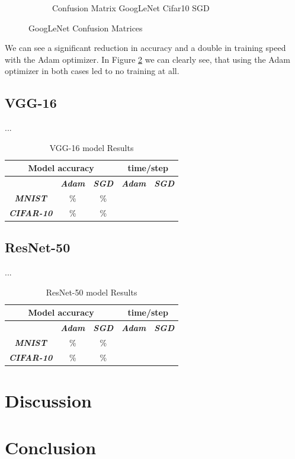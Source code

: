 \documentclass[conference]{IEEEtran}
\begin{document}
\begin{figure}[!htbp]
\begin{subfigure}[b]{0.22\textwidth}
        \caption{Confusion Matrix GoogLeNet Cifar10 SGD}
        \label{fig:x matrix_GoogLeNet_CIFAR_SGD}
    \end{subfigure}
    \caption{GoogLeNet Confusion Matrices}
    \label{fig:GoogLeNet Confusion Matrixis}
\end{figure}

We can see a significant reduction in accuracy and a double in training speed with the Adam optimizer.
In Figure \ref{fig:GoogLeNet Confusion Matrixis} we can clearly see, that using the Adam optimizer in both cases led to no training at all.

\subsection{VGG-16}
...
\begin{table}[!htbp]
    \caption{VGG-16 model Results}
    \begin{center}
    \begin{tabular}{|c|c|c|c|c|}
    \cline{1-5} 
    \multicolumn{3}{|c|}{\textbf{Model accuracy}} & \multicolumn{2}{|c|}{\textbf{time/step}} \\
    \hline 
    \textit{} & \textbf{\textit{Adam}} & \textbf{\textit{SGD}} & \textbf{\textit{Adam}} & \textbf{\textit{SGD}} \\
    \hline
    \textbf{\textit{MNIST}} & \% & \% &  &  \\
    \hline
    \textbf{\textit{CIFAR-10}} & \% & \% &  &  \\
    \cline{1-5} 
    \end{tabular}
    \label{tab: VGG model accuracy}
    \end{center}
\end{table}

\subsection{ResNet-50}
...
\begin{table}[!htbp]
    \caption{ResNet-50 model Results}
    \begin{center}
    \begin{tabular}{|c|c|c|c|c|}
    \cline{1-5} 
    \multicolumn{3}{|c|}{\textbf{Model accuracy}} & \multicolumn{2}{|c|}{\textbf{time/step}} \\
    \hline 
    \textit{} & \textbf{\textit{Adam}} & \textbf{\textit{SGD}} & \textbf{\textit{Adam}} & \textbf{\textit{SGD}} \\
    \hline
    \textbf{\textit{MNIST}} & \% & \% &  &  \\
    \hline
    \textbf{\textit{CIFAR-10}} & \% & \% &  &  \\
    \cline{1-5} 
    \end{tabular}
    \label{tab: ResNet-50 model accuracy}
    \end{center}
\end{table}

\section{Discussion}

\section{Conclusion}

\printbibliography
\end{document}
